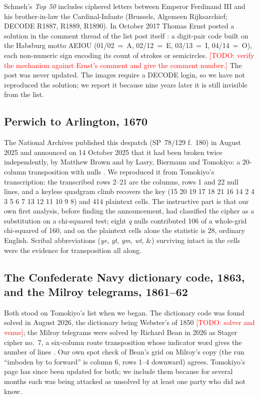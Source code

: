 \documentclass[11pt]{article}
\newcommand{\todo}[1]{\textcolor{red}{[TODO: #1]}}
\begin{document}
Schmeh's \emph{Top 50} includes ciphered letters between Emperor Ferdinand III and his brother-in-law the Cardinal-Infante (Brussels, Algemeen Rijksarchief; DECODE R1887, R1889, R1890). In October 2017 Thomas Ernst posted a solution in the comment thread of the list post itself \cite{Ernst:2017}: a digit-pair code built on the Habsburg motto AEIOU (01/02~=~A, 02/12~=~E, 03/13~=~I, 04/14~=~O), each non-numeric sign encoding its count of strokes or semicircles. \todo{verify the mechanism against Ernst's comment and give the comment number.} The post was never updated. The images require a DECODE login, so we have not reproduced the solution; we report it because nine years later it is still invisible from the list.

\subsection{Perwich to Arlington, 1670}

The National Archives published this despatch (SP~78/129 f.~180) in August 2025 and announced on 14 October 2025 that it had been broken twice independently, by Matthew Brown and by Lasry, Biermann and Tomokiyo: a 20-column transposition with nulls \cite{TNA:perwich}. We reproduced it from Tomokiyo's transcription: the transcribed rows 2--21 are the columns, rows 1 and 22 null lines, and a keyless quadgram climb recovers the key (15 20 19 17 18 21 16 14 2 4 3 5 6 7 13 12 11 10 9 8) and 414 plaintext cells. The instructive part is that our own first analysis, before finding the announcement, had classified the cipher as a substitution on a chi-squared test; eight \emph{q} nulls contributed 106 of a whole-grid chi-squared of 160, and on the plaintext cells alone the statistic is 28, ordinary English. Scribal abbreviations (\emph{ye}, \emph{yt}, \emph{ym}, \emph{wt}, \&) surviving intact in the cells were the evidence for transposition all along.

\subsection{The Confederate Navy dictionary code, 1863, and the Milroy telegrams, 1861--62}

Both stood on Tomokiyo's list when we began. The dictionary code was found solved in August 2026, the dictionary being Webster's of 1850 \todo{solver and venue}; the Milroy telegrams were solved by Richard Bean in 2026 as Stager cipher no.~7, a six-column route transposition whose indicator word gives the number of lines \cite{Bean:2026}. Our own spot check of Bean's grid on Milroy's copy (the run ``imboden by to forward'' is column 6, rows 1--4 downward) agrees. Tomokiyo's page has since been updated for both; we include them because for several months each was being attacked as unsolved by at least one party who did not know.
\end{document}
